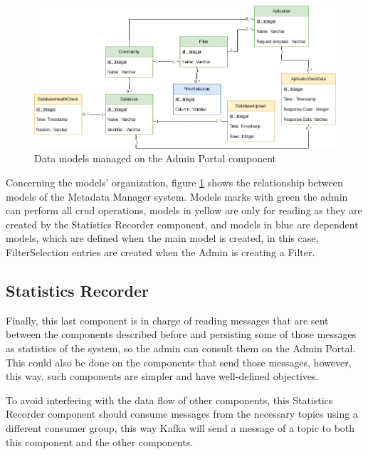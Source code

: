 \begin{figure}[H]
    \center
    \includegraphics[width=\textwidth]{data-models}
    \caption{Data models managed on the Admin Portal component}
    \label{fig:data-models}
\end{figure}

Concerning the models' organization, figure \ref{fig:data-models} shows the relationship between models of the Metadata Manager system.
Models marks with green the admin can perform all \gls{crud} operations, models in yellow are only for reading as they are created by the Statistics Recorder component, and models in blue are dependent models, which are defined when the main model is created, in this case, FilterSelection entries are created when the Admin is creating a Filter.

\subsection{Statistics Recorder}

Finally, this last component is in charge of reading messages that are sent between the components described before and persisting some of those messages as statistics of the system, so the admin can consult them on the Admin Portal.
This could also be done on the components that send those messages, however, this way, such components are simpler and have well-defined objectives.

To avoid interfering with the data flow of other components, this Statistics Recorder component should consume messages from the necessary topics using a different consumer group, this way Kafka will send a message of a topic to both this component and the other components.


